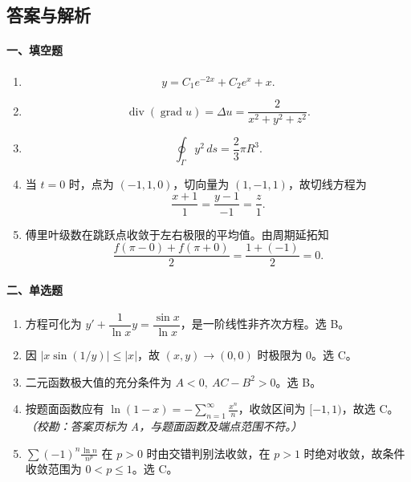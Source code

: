 \subsection{答案与解析}

\paragraph*{一、填空题}
\begin{enumerate}
  \item
  \[
    y=C_1e^{-2x}+C_2e^x+x.
  \]

  \item
  \[
    \operatorname{div}(\operatorname{grad}u)
    =\Delta u=\frac{2}{x^2+y^2+z^2}.
  \]

  \item
  \[
    \oint_{\Gamma}y^2\,ds=\frac{2}{3}\pi R^3.
  \]

  \item 当 $t=0$ 时，点为 $(-1,1,0)$，切向量为 $(1,-1,1)$，故切线方程为
  \[
    \frac{x+1}{1}=\frac{y-1}{-1}=\frac{z}{1}.
  \]

  \item 傅里叶级数在跳跃点收敛于左右极限的平均值。由周期延拓知
  \[
    \frac{f(\pi-0)+f(\pi+0)}{2}=\frac{1+(-1)}{2}=0.
  \]
\end{enumerate}

\paragraph*{二、单选题}
\begin{enumerate}
  \item 方程可化为 \(y'+\dfrac1{\ln x}y=\dfrac{\sin x}{\ln x}\)，是一阶线性非齐次方程。选 B。
  \item 因 \(|x\sin(1/y)|\le |x|\)，故 $(x,y)\to(0,0)$ 时极限为 $0$。选 C。
  \item 二元函数极大值的充分条件为 \(A<0,\ AC-B^2>0\)。选 B。
  \item 按题面函数应有 \(\displaystyle \ln(1-x)=-\sum_{n=1}^{\infty}\frac{x^n}{n}\)，收敛区间为 $[-1,1)$，故选 C。\textit{（校勘：答案页标为 A，与题面函数及端点范围不符。）}
  \item \(\displaystyle \sum (-1)^n\frac{\ln n}{n^p}\) 在 $p>0$ 时由交错判别法收敛，在 $p>1$ 时绝对收敛，故条件收敛范围为 $0<p\le1$。选 C。
\end{enumerate}

